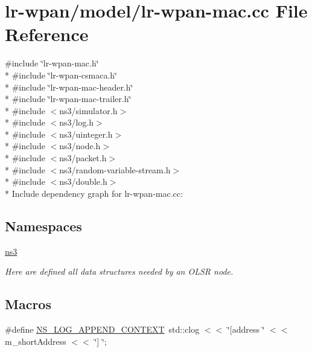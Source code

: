 \hypertarget{lr-wpan-mac_8cc}{}\section{lr-\/wpan/model/lr-\/wpan-\/mac.cc File Reference}
\label{lr-wpan-mac_8cc}
{\ttfamily \#include \char`\"{}lr-\/wpan-\/mac.\+h\char`\"{}}\\*
{\ttfamily \#include \char`\"{}lr-\/wpan-\/csmaca.\+h\char`\"{}}\\*
{\ttfamily \#include \char`\"{}lr-\/wpan-\/mac-\/header.\+h\char`\"{}}\\*
{\ttfamily \#include \char`\"{}lr-\/wpan-\/mac-\/trailer.\+h\char`\"{}}\\*
{\ttfamily \#include $<$ns3/simulator.\+h$>$}\\*
{\ttfamily \#include $<$ns3/log.\+h$>$}\\*
{\ttfamily \#include $<$ns3/uinteger.\+h$>$}\\*
{\ttfamily \#include $<$ns3/node.\+h$>$}\\*
{\ttfamily \#include $<$ns3/packet.\+h$>$}\\*
{\ttfamily \#include $<$ns3/random-\/variable-\/stream.\+h$>$}\\*
{\ttfamily \#include $<$ns3/double.\+h$>$}\\*
Include dependency graph for lr-\/wpan-\/mac.cc\+:
\subsection*{Namespaces}
\begin{DoxyCompactItemize}
\item 
 \hyperlink{namespacens3}{ns3}
\begin{DoxyCompactList}\small\item\em Here are defined all data structures needed by an O\+L\+SR node. \end{DoxyCompactList}\end{DoxyCompactItemize}
\subsection*{Macros}
\begin{DoxyCompactItemize}
\item 
\#define \hyperlink{lr-wpan-mac_8cc_abe50035652d407c40bdaef78214c4955}{N\+S\+\_\+\+L\+O\+G\+\_\+\+A\+P\+P\+E\+N\+D\+\_\+\+C\+O\+N\+T\+E\+XT}~std\+::clog $<$$<$ \char`\"{}\mbox{[}address \char`\"{} $<$$<$ m\+\_\+short\+Address $<$$<$ \char`\"{}\mbox{]} \char`\"{};
\end{DoxyCompactItemize}
